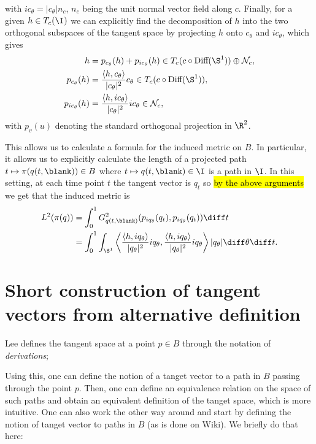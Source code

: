 with $i c_{\theta} = |c_{\theta}| n_c$, $n_c$ being the unit normal
vector field along $c$. Finally, for a given $h \in T_c(\I)$
we can explicitly find the decomposition of $h$ into the two orthogonal
subspaces of the tangent space by projecting $h$ onto $c_{\theta}$ and
$ic_{\theta}$, which gives
\begin{equation*}
  \begin{aligned}
    h &  = p_{c_{\theta}}(h) + p_{ic_{\theta}}(h)
    \in T_c(c \circ \text{Diff}(\S^{1})) \oplus \mathcal{N}_c
    ,\\
    p_{c_{\theta}}(h) & =
    \frac{\langle h, c_{\theta}\rangle}{|c_{\theta}|^2} c_{\theta}
    \in T_c(c \circ \text{Diff}(\S^{1})), \\
    p_{ic_{\theta}}(h) & =
    \frac{\langle h, ic_{\theta}\rangle}{|c_{\theta}|^2} ic_{\theta}
    \in \mathcal{N}_c,
  \end{aligned}
\end{equation*}
with $p_{v}(u)$ denoting the standard orthogonal projection in $\R^2$.

This allows us to calculate a formula for
the induced metric on $B$. In particular, it allows us to explicitly calculate
the length of a projected path $t \mapsto \pi(q(t,\blank)) \in B $
where $t \mapsto q(t,\blank) \in \I$ is a path in $\I$.
In this setting, at each time point $t$
the tangent vector is $q_t$ so \hl{by the above arguments} we get that
the induced metric is
\begin{equation*}
  \begin{aligned}
    L^2(\pi(q))& = \int_{0}^{1}
    G^2_{q(t,\blank)}(p_{iq_{\theta}}(q_t),p_{iq_{\theta}}(q_t)) \diff t \\
    & = \int_{0}^{1}
    \int_{\S^1}
    \left\langle
      \frac{\langle h, iq_{\theta}\rangle}{|q_{\theta}|^2} iq_{\theta},
      \frac{\langle h, iq_{\theta}\rangle}{|q_{\theta}|^2} iq_{\theta}
  \right\rangle | q_{\theta}|\diff \theta \diff t.
  \end{aligned}
\end{equation*}

\section{Short construction of tangent vectors from alternative definition}
\label{sec:short-constr-tang}

Lee defines the tangent
space at a point $p \in B$ through the notation of
\textit{derivations};

Using this, one can define the notion of a
tanget vector to a path in $B$ passing through the point $p$. Then,
one can define an equivalence relation on the space of such paths and
obtain an equivalent definition of the tanget space, which is more
intuitive. One can also work the other way around and start by
defining the notion of tanget vector to paths in $B$ (as is done on
Wiki). We briefly do that here:

